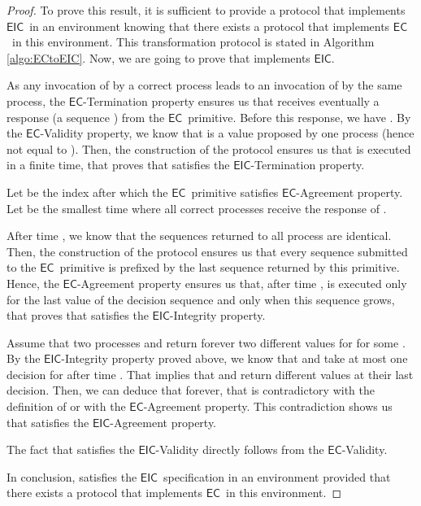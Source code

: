 \documentclass[11pt]{article}
\newcommand{\EC}{\ensuremath{\mathsf{EC}}}
\newcommand{\EIC}{\ensuremath{\mathsf{EIC}}}
\begin{document}
\begin{proof}
To prove this result, it is sufficient to provide a protocol that implements \EIC~in an environment  knowing that there exists a protocol that implements \EC~in this environment. This transformation protocol  is stated in Algorithm \ref{algo:ECtoEIC}. Now, we are going to prove that  implements \EIC.

As any invocation of  by a correct process  leads to an invocation of  by the same process, the \EC-Termination property ensures us that  receives eventually a response (a sequence ) from the \EC~primitive. Before this response, we have . By the \EC-Validity property, we know that  is a value proposed by one process (hence not equal to ). Then, the construction of the protocol ensures us that  is executed in a finite time, that proves that  satisfies the \EIC-Termination property.

Let  be the index after which the \EC~primitive satisfies \EC-Agreement property. Let  be the smallest time where all correct processes receive the response of .

After time , we know that the sequences  returned to all process are identical. Then, the construction of the protocol ensures us that every sequence submitted to the \EC~primitive is prefixed by the last sequence returned by this primitive. Hence, the \EC-Agreement property ensures us that, after time ,  is executed only for the last value of the decision sequence and only when this sequence grows, that proves that  satisfies the \EIC-Integrity property.

Assume that two processes  and  return forever two different values for  for some . By the \EIC-Integrity property proved above, we know that  and  take at most one decision for  after time . That implies that  and  return different values at their last decision. Then, we can deduce that  forever, that is contradictory with the definition of  or with the \EC-Agreement property. This contradiction shows us that  satisfies the \EIC-Agreement property.

The fact that  satisfies the \EIC-Validity directly follows from the \EC-Validity.

In conclusion,  satisfies the \EIC~specification in an environment  provided that there exists a protocol that implements \EC~in this environment.
\end{proof}
\end{document}

